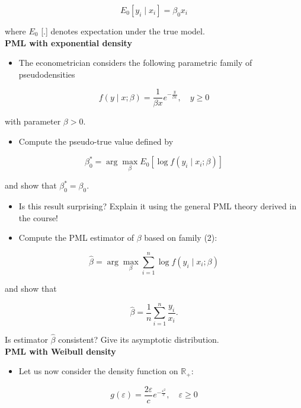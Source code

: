 $$
E_{0}\left[y_{i} \mid x_{i}\right]=\beta_{0} x_{i}
$$

where $E_{0}$ [.] denotes expectation under the true model.\\
\textbf{PML with exponential density}

\begin{itemize}
  \item The econometrician considers the following parametric family of pseudodensities
\end{itemize}


\begin{equation}
f(y \mid x ; \beta)=\frac{1}{\beta x} e^{-\frac{y}{\beta x}}, \quad y \geq 0 \label{eq:f}
\end{equation}


with parameter $\beta>0$.

\begin{itemize}
  \item Compute the pseudo-true value defined by
\end{itemize}

$$
\beta_{0}^{*}=\arg \max _{\beta} E_{0}\left[\log f\left(y_{i} \mid x_{i} ; \beta\right)\right]
$$

and show that $\beta_{0}^{*}=\beta_{0}$.

\begin{itemize}
  \item Is this result surprising? Explain it using the general PML theory derived in the course!
  \item Compute the PML estimator of $\beta$ based on family (2):
\end{itemize}

$$
\hat{\beta}=\arg \max _{\beta} \sum_{i=1}^{n} \log f\left(y_{i} \mid x_{i} ; \beta\right)
$$

and show that

$$
\hat{\beta}=\frac{1}{n} \sum_{i=1}^{n} \frac{y_{i}}{x_{i}} .
$$

Is estimator $\hat{\beta}$ consistent? Give its asymptotic distribution.\\
\textbf{PML with Weibull density}

\begin{itemize}
  \item Let us now consider the density function on $\mathbb{R}_{+}$:
\end{itemize}

$$
g(\varepsilon)=\frac{2 \varepsilon}{c} e^{-\frac{\varepsilon^{2}}{c}}, \quad \varepsilon \geq 0
$$


